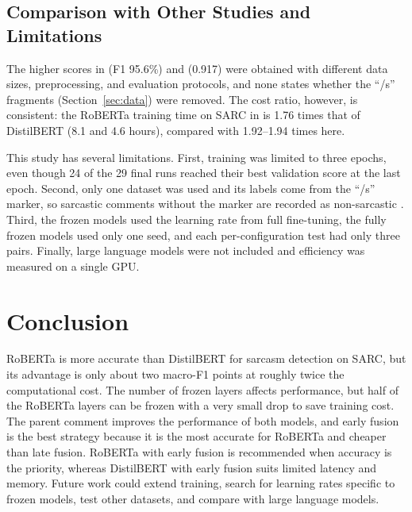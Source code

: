 \documentclass[conference]{IEEEtran}
\begin{document}
\subsection{Comparison with Other Studies and Limitations}
The higher scores in \cite{dubey2026efficient} (F1 95.6\%) and \cite{zhang2025enhancing} (0.917) were obtained with different data sizes, preprocessing, and evaluation protocols, and none states whether the ``/s'' fragments (Section~\ref{sec:data}) were removed. The cost ratio, however, is consistent: the RoBERTa training time on SARC in \cite{dubey2026efficient} is 1.76 times that of DistilBERT (8.1 and 4.6 hours), compared with 1.92--1.94 times here.

This study has several limitations. First, training was limited to three epochs, even though 24 of the 29 final runs reached their best validation score at the last epoch. Second, only one dataset was used and its labels come from the ``/s'' marker, so sarcastic comments without the marker are recorded as non-sarcastic \cite{khodak2018sarc}. Third, the frozen models used the learning rate from full fine-tuning, the fully frozen models used only one seed, and each per-configuration test had only three pairs. Finally, large language models were not included and efficiency was measured on a single GPU.

\section{Conclusion}
RoBERTa is more accurate than DistilBERT for sarcasm detection on SARC, but its advantage is only about two macro-F1 points at roughly twice the computational cost. The number of frozen layers affects performance, but half of the RoBERTa layers can be frozen with a very small drop to save training cost. The parent comment improves the performance of both models, and early fusion is the best strategy because it is the most accurate for RoBERTa and cheaper than late fusion. RoBERTa with early fusion is recommended when accuracy is the priority, whereas DistilBERT with early fusion suits limited latency and memory. Future work could extend training, search for learning rates specific to frozen models, test other datasets, and compare with large language models.



\end{document}
